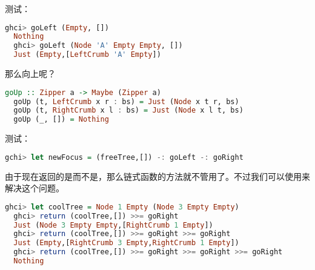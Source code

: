 \documentclass[./main.tex]{subfiles}
\begin{document}
测试：

\begin{lstlisting}[language=Haskell]
  ghci> goLeft (Empty, [])
  Nothing
  ghci> goLeft (Node 'A' Empty Empty, [])
  Just (Empty,[LeftCrumb 'A' Empty])
\end{lstlisting}

那么向上呢？

\begin{lstlisting}[language=Haskell]
  goUp :: Zipper a -> Maybe (Zipper a)
  goUp (t, LeftCrumb x r : bs) = Just (Node x t r, bs)
  goUp (t, RightCrumb x l : bs) = Just (Node x l t, bs)
  goUp (_, []) = Nothing
\end{lstlisting}

测试：

\begin{lstlisting}[language=Haskell]
  gchi> let newFocus = (freeTree,[]) -: goLeft -: goRight
\end{lstlisting}

由于现在返回的是而不是，那么链式函数的方法就不管用了。不过我们可以使用\acode{>>=}来解决这个问题。

\begin{lstlisting}[language=Haskell]
  ghci> let coolTree = Node 1 Empty (Node 3 Empty Empty)
  ghci> return (coolTree,[]) >>= goRight
  Just (Node 3 Empty Empty,[RightCrumb 1 Empty])
  ghci> return (coolTree,[]) >>= goRight >>= goRight
  Just (Empty,[RightCrumb 3 Empty,RightCrumb 1 Empty])
  ghci> return (coolTree,[]) >>= goRight >>= goRight >>= goRight
  Nothing
\end{lstlisting}
\end{document}
